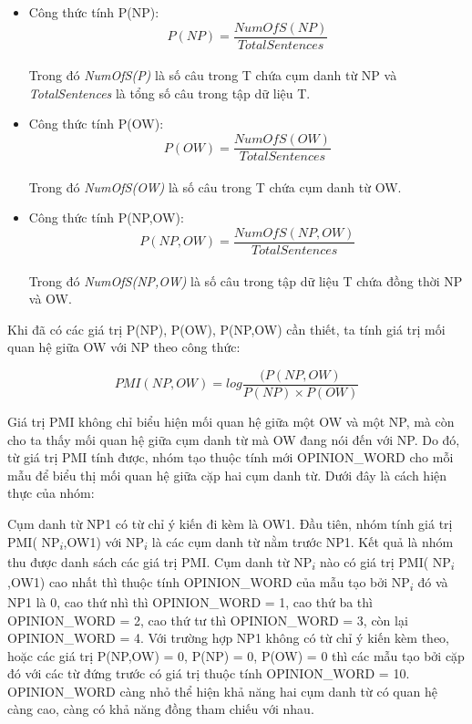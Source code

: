 \documentclass[12pt]{extarticle}
\begin{document}
				\begin{itemize}
					\item{Công thức tính P(NP):
						\begin{equation*}
						P(NP) = \frac{NumOfS(NP)}{TotalSentences}
						\end{equation*}
					\\Trong đó \textit{NumOfS(P)} là số câu trong T chứa cụm danh từ NP và \textit{TotalSentences} là tổng số câu trong tập dữ liệu T.}
					\item{Công thức tính P(OW):
						\begin{equation*}
						P(OW) = \frac{NumOfS(OW)}{TotalSentences}
						\end{equation*}
					\\Trong đó \textit{NumOfS(OW)} là số câu trong T chứa cụm danh từ OW.}
					\item{Công thức tính P(NP,OW):
						\begin{equation*}
						P(NP,OW) = \frac{NumOfS(NP,OW)}{TotalSentences}
						\end{equation*}
					\\Trong đó \textit{NumOfS(NP,OW)} là số câu trong tập dữ liệu T chứa đồng thời NP và OW.}
				\end{itemize}
				\par Khi đã có các giá trị P(NP), P(OW), P(NP,OW) cần thiết, ta tính giá trị mối quan hệ giữa OW với NP theo công thức:
				\begin{center}
					\begin{equation*}
					PMI(NP,OW) = log\frac{(P(NP,OW)}{P(NP)\times P(OW)}
					\end{equation*}
				\end{center}
				\par Giá trị PMI không chỉ biểu hiện mối quan hệ giữa một OW và một NP, mà còn cho ta thấy mối quan hệ giữa cụm danh từ mà OW đang nói đến với NP. Do đó, từ giá trị PMI tính được, nhóm tạo thuộc tính mới OPINION\_WORD cho mỗi mẫu để biểu thị mối quan hệ giữa cặp hai cụm danh từ. Dưới đây là cách hiện thực của nhóm: 
				\par Cụm danh từ NP1 có từ chỉ ý kiến đi kèm là OW1. Đầu tiên, nhóm tính giá trị PMI( NP\textsubscript{$i$},OW1) với  NP\textsubscript{$i$} là các cụm danh từ nằm trước NP1. Kết quả là nhóm thu được danh sách các giá trị PMI. Cụm danh từ  NP\textsubscript{$i$} nào có giá trị PMI( NP\textsubscript{$i$},OW1) cao nhất thì thuộc tính OPINION\_WORD của mẫu tạo bởi  NP\textsubscript{$i$} đó và NP1 là 0, cao thứ nhì thì OPINION\_WORD = 1, cao thứ ba thì OPINION\_WORD = 2, cao thứ tư thì OPINION\_WORD = 3, còn lại OPINION\_WORD = 4. Với trường hợp NP1 không có từ chỉ ý kiến kèm theo, hoặc các giá trị P(NP,OW) = 0, P(NP) = 0, P(OW) = 0 thì  các mẫu tạo bởi cặp đó với các từ đứng trước có giá trị thuộc tính OPINION\_WORD = 10. OPINION\_WORD càng nhỏ thể hiện khả năng hai cụm danh từ có quan hệ càng cao, càng có khả năng đồng tham chiếu với nhau.
\end{document}
